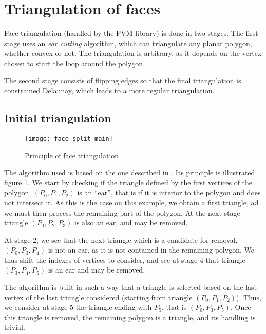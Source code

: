 \section{Triangulation of faces\label{sec:triangle}}

Face triangulation (handled by the FVM library) is done in two
stages. The first stage uses an \emph{ear cutting} algorithm, which
can triangulate any planar polygon, whether convex or not.
The triangulation is arbitrary, as it depends on the vertex chosen
to start the loop around the polygon.

The second stage consists of flipping edges so that the final
triangulation is constrained Delaunay, which leads to a
more regular triangulation.

\subsection{Initial triangulation\label{sec:triangle_ini}}

\begin{figure}[!h]
\centerline{
\texttt{[image: face\_split\_main]}}
\caption{Principle of face triangulation}
\label{fig:algo.ear_splitting}
\end{figure}

The algorithm used is based on the one described in \cite{triangl1}.
Its principle is illustrated figure \ref{fig:algo.ear_splitting}.
We start by checking if the triangle defined by the first vertices
of the polygon, $(P_0, P_1, P_2)$ is an ``ear'', that is if it is
interior to the polygon and does not intersect it. As this is the case
on this example, we obtain a first triangle, ad we must then process
the remaining part of the polygon. At the next stage triangle
$(P_0, P_2, P_3)$ is also an ear, and may be removed.

At stage $2$, we see that the next triangle which is a candidate for
removal, $(P_0, P_3, P_4)$ is not an ear, as it is not contained in the
remaining polygon. We thus shift the indexes of vertices to consider,
and see at stage $4$ that triangle $(P_3, P_4, P_5)$
is an ear and may be removed.

The algorithm is built in such a way that a triangle is selected based on
the last vertex of the last triangle considered (starting from triangle
$(P_0, P_1, P_2)$). Thus, we consider at stage $5$ the triangle ending
with $P_5$, that is $(P_0, P_3, P_5)$.
Once this triangle is removed, the remaining polygon is a triangle,
and its handling is trivial.

